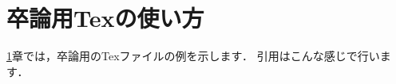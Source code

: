 \chapter{卒論用Texの使い方}
\label{ch:graduation-thesis-intro}

\ref{ch:graduation-thesis-intro}章では，卒論用のTexファイルの例を示します．
引用はこんな感じ\cite{fasterrcnn}で行います．
